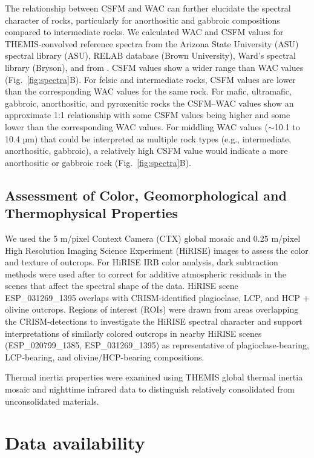 \documentclass[11pt]{article}
\begin{document}
The relationship between CSFM and WAC can further elucidate the spectral character of rocks, particularly for anorthositic and gabbroic compositions compared to intermediate rocks. We calculated WAC and CSFM values for THEMIS-convolved reference spectra from the Arizona State University (ASU) spectral library (ASU), RELAB database (Brown University), Ward's spectral library (Bryson), and from \citet{Dunn2021}. CSFM values show a wider range than WAC values (Fig.~\ref{fig:spectra}B). For felsic and intermediate rocks, CSFM values are lower than the corresponding WAC values for the same rock. For mafic, ultramafic, gabbroic, anorthositic, and pyroxenitic rocks the CSFM--WAC values show an approximate 1:1 relationship with some CSFM values being higher and some lower than the corresponding WAC values. For middling WAC values ($\sim$10.1 to 10.4 µm) that could be interpreted as multiple rock types (e.g., intermediate, anorthositic, gabbroic), a relatively high CSFM value would indicate a more anorthositic or gabbroic rock (Fig.~\ref{fig:spectra}B).

\subsection*{Assessment of Color, Geomorphological and Thermophysical Properties}

We used the 5 m/pixel Context Camera (CTX) global mosaic \citep{Malin2007, Dickson2018} and 0.25 m/pixel High Resolution Imaging Science Experiment (HiRISE) images \citep{McEwen2010} to assess the color and texture of outcrops. For HiRISE IRB color analysis, dark subtraction methods were used after \citet{Tornabene2018} to correct for additive atmospheric residuals in the scenes that affect the spectral shape of the data. HiRISE scene ESP\_031269\_1395 overlaps with CRISM-identified plagioclase, LCP, and HCP + olivine outcrops. Regions of interest (ROIs) were drawn from areas overlapping the CRISM-detections to investigate the HiRISE spectral character and support interpretations of similarly colored outcrops in nearby HiRISE scenes (ESP\_020799\_1385, ESP\_031269\_1395) as representative of plagioclase-bearing, LCP-bearing, and olivine/HCP-bearing compositions.

Thermal inertia properties were examined using THEMIS global thermal inertia mosaic \citep{Fergason2006, Edwards2009} and nighttime infrared data \citep{Edwards2011} to distinguish relatively consolidated from unconsolidated materials.

\section*{Data availability}
\end{document}
